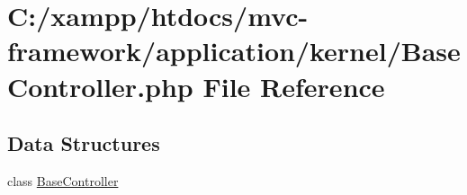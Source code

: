 \hypertarget{_base_controller_8php}{}\section{C\+:/xampp/htdocs/mvc-\/framework/application/kernel/\+Base\+Controller.php File Reference}
\label{_base_controller_8php}
\subsection*{Data Structures}
\begin{DoxyCompactItemize}
\item 
class \hyperlink{class_base_controller}{Base\+Controller}
\end{DoxyCompactItemize}
